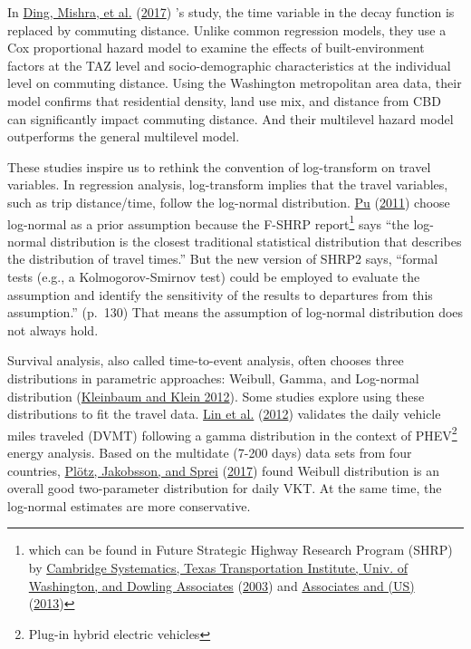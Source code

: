 \documentclass[
  12pt,
]{article}
\begin{document}
In \protect\hyperlink{ref-dingInfluencesBuiltEnvironment2017}{Ding, Mishra, et al.} (\protect\hyperlink{ref-dingInfluencesBuiltEnvironment2017}{2017}) 's study, the time variable in the decay function is replaced by commuting distance. Unlike common regression models, they use a Cox proportional hazard model to examine the effects of built-environment factors at the TAZ level and socio-demographic characteristics at the individual level on commuting distance. Using the Washington metropolitan area data, their model confirms that residential density, land use mix, and distance from CBD can significantly impact commuting distance. And their multilevel hazard model outperforms the general multilevel model.

These studies inspire us to rethink the convention of log-transform on travel variables. In regression analysis, log-transform implies that the travel variables, such as trip distance/time, follow the log-normal distribution. \protect\hyperlink{ref-puAnalyticRelationshipsTravel2011}{Pu} (\protect\hyperlink{ref-puAnalyticRelationshipsTravel2011}{2011}) choose log-normal as a prior assumption because the F-SHRP report\footnote{which can be found in Future Strategic Highway Research Program (SHRP) by \protect\hyperlink{ref-cambridge2003providing}{Cambridge Systematics, Texas Transportation Institute, Univ. of Washington, and Dowling Associates} (\protect\hyperlink{ref-cambridge2003providing}{2003}) and \protect\hyperlink{ref-kittelson2013evaluating}{Associates and (US)} (\protect\hyperlink{ref-kittelson2013evaluating}{2013})} says ``the log-normal distribution is the closest traditional statistical distribution that describes the distribution of travel times.'' But the new version of SHRP2 says, ``formal tests (e.g., a Kolmogorov-Smirnov test) could be employed to evaluate the assumption and identify the sensitivity of the results to departures from this assumption.'' (p.~130) That means the assumption of log-normal distribution does not always hold.

Survival analysis, also called time-to-event analysis, often chooses three distributions in parametric approaches: Weibull, Gamma, and Log-normal distribution (\protect\hyperlink{ref-kleinbaumSurvivalAnalysisSelfLearning2012}{Kleinbaum and Klein 2012}). Some studies explore using these distributions to fit the travel data. \protect\hyperlink{ref-linEstimationEnergyUse2012}{Lin et al.} (\protect\hyperlink{ref-linEstimationEnergyUse2012}{2012}) validates the daily vehicle miles traveled (DVMT) following a gamma distribution in the context of PHEV\footnote{Plug-in hybrid electric vehicles} energy analysis. Based on the multidate (7-200 days) data sets from four countries, \protect\hyperlink{ref-plotzDistributionIndividualDaily2017}{Plötz, Jakobsson, and Sprei} (\protect\hyperlink{ref-plotzDistributionIndividualDaily2017}{2017}) found Weibull distribution is an overall good two-parameter distribution for daily VKT. At the same time, the log-normal estimates are more conservative.
\end{document}
